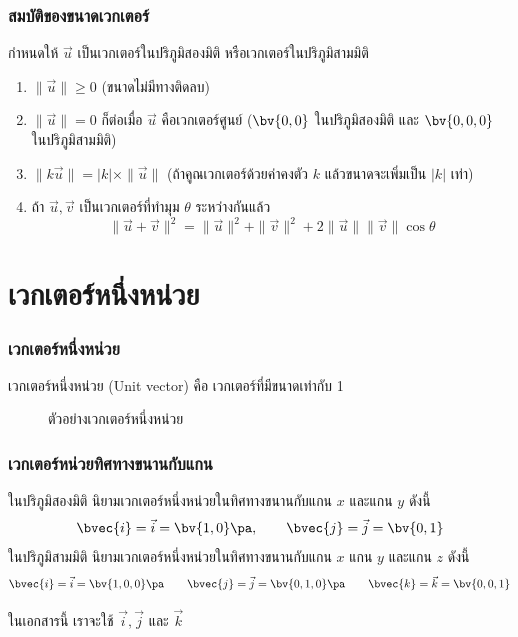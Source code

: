 \begin{frame}
\frametitle{สมบัติของขนาดเวกเตอร์}
\begin{prop}{}{}
กำหนดให้ $\vec{u}$ เป็นเวกเตอร์ในปริภูมิสองมิติ หรือเวกเตอร์ในปริภูมิสามมิติ
\begin{enumerate}
\item $\| \vec{u} \| \geq 0$ (ขนาดไม่มีทางติดลบ)\pa
\item $\| \vec{u} \| = 0$ ก็ต่อเมื่อ $\vec{u}$ คือเวกเตอร์ศูนย์ ($\bv{0,0}$ ในปริภูมิสองมิติ และ $\bv{0,0,0}$ ในปริภูมิสามมิติ) \pa
\item $\| k \vec{u} \| = |k| \times \|\vec{u}\|$ (ถ้าคูณเวกเตอร์ด้วยค่าคงตัว $k$ แล้วขนาดจะเพิ่มเป็น $|k|$ เท่า) \pa
\item ถ้า $\vec{u}, \vec{v}$ เป็นเวกเตอร์ที่ทำมุม $\theta$ ระหว่างกันแล้ว 
\begin{equation}
\| \vec{u} + \vec{v} \|^2 = \| \vec{u} \|^2 + \|\vec{v}\|^2 + 2\| \vec{u} \|\|\vec{v}\| \cos \theta
\end{equation}
\end{enumerate}

\end{prop}
\end{frame}


\section{เวกเตอร์หนึ่งหน่วย}
\frame{\sectionpage}

\begin{frame}[t]
\frametitle{เวกเตอร์หนึ่งหน่วย}
\begin{defn}{}{}
เวกเตอร์หนึ่งหน่วย (Unit vector) คือ เวกเตอร์ที่มีขนาดเท่ากับ 1
\end{defn}\pa

\begin{figure}[h!]
\centering
{}
\caption{ตัวอย่างเวกเตอร์หนึ่งหน่วย}
\end{figure}
\end{frame}

\begin{frame}
\frametitle{เวกเตอร์หน่วยทิศทางขนานกับแกน}
\begin{defn}{}{}
ในปริภูมิสองมิติ นิยามเวกเตอร์หนึ่งหน่วยในทิศทางขนานกับแกน $x$ และแกน $y$ ดังนี้\pa
\[\bvec{i} = \vec{i} = \bv{1,0} \pa, \qquad \bvec{j} = \vec{j} = \bv{0,1}\]
ในปริภูมิสามมิติ นิยามเวกเตอร์หนึ่งหน่วยในทิศทางขนานกับแกน $x$ แกน $y$ และแกน $z$ ดังนี้\pa
\[\bvec{i} = \vec{i} = \bv{1,0,0} \pa \qquad  \bvec{j} = \vec{j} = \bv{ 0,1,0 } \pa \qquad \bvec{k} = \vec{k} = \bv{ 0,0,1} \]
\end{defn} \pa
ในเอกสารนี้ เราจะใช้ $\vec{i}, \vec{j}$ และ $\vec{k}$ 
\end{frame}


